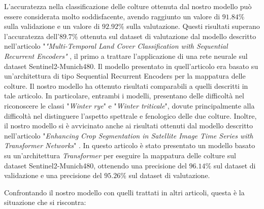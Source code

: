 L'accuratezza nella classificazione delle colture ottenuta dal nostro modello 
può essere considerata molto soddisfacente, avendo raggiunto  
un valore di $91.84\%$ sulla validazione e un valore di $92.92\%$ sulla valutazione. 
Questi risultati superano l'accuratezza dell'$89.7\%$ ottenuta sul dataset di valutazione 
dal modello descritto nell'articolo "\textit{"Multi-Temporal Land Cover Classification with 
Sequential Recurrent Encoders"} \cite{ARTICOLO_ORIGINALE_MUNICH}, il primo a trattare 
l'applicazione di una rete neurale sul dataset Sentinel2-Munich480.
Il modello presentato in quell'articolo era basato su un'architettura di 
tipo Sequential Recurrent Encoders \cite{RETE_RICORRENTE} per la mappatura delle colture.
Il nostro modello ha ottenuto risultati comparabili a quelli descritti in tale articolo. 
In particolare, entrambi i modelli, presentano delle difficoltà nel riconoscere
le classi "\textit{Winter rye}" e "\textit{Winter triticale}", dovute principalmente 
alla difficoltà nel distinguere l'aspetto spettrale e fenologico delle due colture. 
Inoltre, il nostro modello si è avvicinato anche ai risultati ottenuti dal modello descritto 
nell'articolo
"\textit{Enhancing Crop Segmentation in Satellite Image Time Series with Transformer Networks}" 
\cite{ARTICOLO_TRANSFORMER}. 
In questo articolo è stato presentato un modello basato su un'architettura 
\textit{Transformer} \cite{TRANSFORMER} per eseguire la mappatura delle 
colture sul dataset Sentinel2-Munich480, ottenendo una precisione del $96.14\%$ 
sul dataset di validazione e una precisione del $95.26\%$ sul dataset di valutazione.

\newpage
Confrontando il nostro modello con quelli trattati in altri articoli, questa è 
la situazione che si riscontra:


